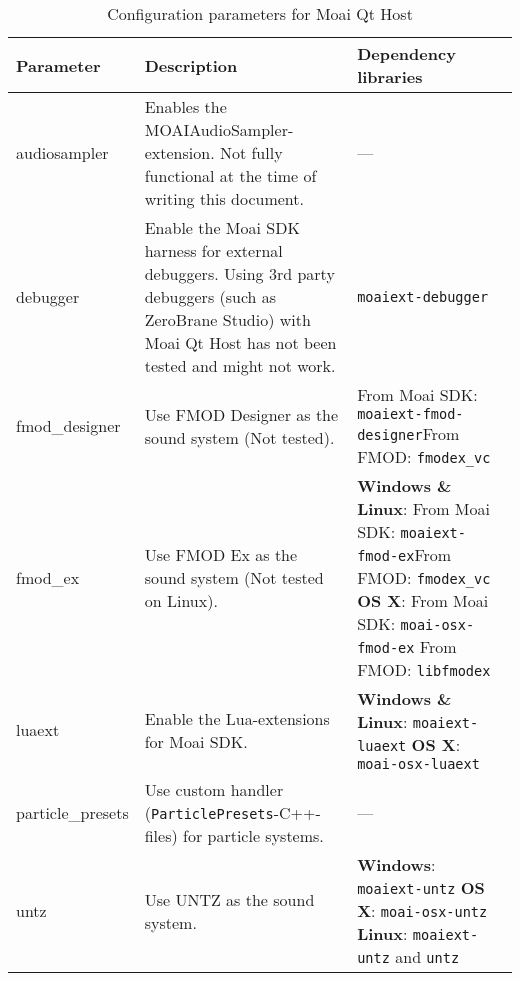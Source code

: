 \begin{table}[h!]
\begin{center}
\caption{Configuration parameters for Moai Qt Host}
\label{config_params}
\begin{tabular}{|l|p{}|p{}|}
\hline
Parameter & Description & Dependency libraries\\ 
\hline
\hline
audiosampler & Enables the MOAIAudioSampler-extension. Not fully functional at the time of writing this document. & ---\\
\hline
debugger & Enable the Moai SDK harness for external debuggers. Using 3rd party debuggers (such as ZeroBrane Studio) with Moai Qt Host has not been tested and might not work. & \texttt{moaiext-debugger}\\
\hline
fmod\_designer & Use FMOD Designer as the sound system (Not tested). & From Moai SDK: \texttt{moaiext-fmod-designer}\newline From FMOD: \texttt{fmodex\_vc}\\
\hline
fmod\_ex & Use FMOD Ex as the sound system (Not tested on Linux). & \textbf{Windows \& Linux}: \newline From Moai SDK: \texttt{moaiext-fmod-ex}\newline From FMOD: \texttt{fmodex\_vc} \newline \textbf{OS X}: \newline From Moai SDK: \texttt{moai-osx-fmod-ex} \newline From FMOD: \texttt{libfmodex}\\
\hline
luaext & Enable the Lua-extensions for Moai SDK. & \textbf{Windows \& Linux}: \texttt{moaiext-luaext} \newline \textbf{OS X}: \texttt{moai-osx-luaext}\\
\hline
particle\_presets & Use custom handler (\texttt{ParticlePresets}-C++-files) for particle systems. & ---\\
\hline
untz & Use UNTZ as the sound system. & \textbf{Windows}: \texttt{moaiext-untz} \newline \textbf{OS X}: \texttt{moai-osx-untz} \newline \textbf{Linux}: \texttt{moaiext-untz} and \texttt{untz}\\
\hline
\end{tabular}
\end{center}
\end{table}
